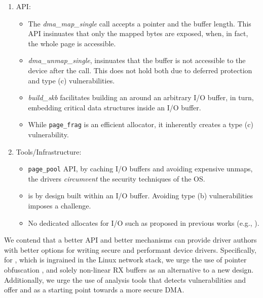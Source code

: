 \begin{enumerate}
    \item API: 
    \begin{itemize}[wide, labelwidth=!, labelindent=0pt]
        \item The \textit{dma\_map\_single} call accepts a pointer and the buffer length. This API insinuates that only the mapped bytes are exposed, when, in fact, the whole page is accessible.
        \item \textit{dma\_unmap\_single}, insinuates that the buffer is not accessible to the device after the call. This does not hold both due to deferred protection and type (c) \subpage{} vulnerabilities.
        \item \textit{build\_skb} facilitates building an \skb{} around an arbitrary I/O buffer, in turn, embedding critical data structures inside an I/O buffer.
        \item While \texttt{page\_frag} is an efficient allocator, it inherently creates a type (c) \subpage{} vulnerability.
    \end{itemize} 
    \item Tools/Infrastructure: 
    \begin{itemize}[wide, labelwidth=!, labelindent=0pt]
            \item \texttt{page\_pool} API, by caching I/O buffers and avoiding expensive unmaps, the drivers \emph{circumvent} the security techniques of the OS. 
            \item \shinfo{} is by design built within an I/O buffer. Avoiding type (b) \subpage{} vulnerabilities imposes a challenge.
            \item No dedicated allocates for I/O such as proposed in previous works (e.g., \cite{MSMT18,MMT16}).
    \end{itemize}
\end{enumerate}

We contend that a better API and better mechanisms can provide driver authors with better options for writing secure and performant device drivers. Specifically, for \shinfo{}, which is ingrained in the Linux network stack, we urge the use of pointer obfuscation \cite{Coo17}, and solely non-linear RX buffers as an alternative to a new design. Additionally, we urge the use of analysis tools that detects \subpage{} vulnerabilities and offer \tool{} and \dkasan as a starting point towards a more secure DMA.

